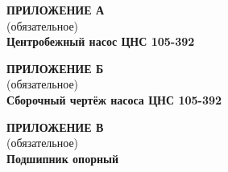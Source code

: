 
\newpage
{}
{}
\begin{center}
{\normalsize\bfseries ПРИЛОЖЕНИЕ А}\\
(обязательное)\\[\baselineskip]
{\normalsize\bfseries Центробежный насос ЦНС 105-392}
\end{center}

\newpage
{}
{}
\begin{center}
{\normalsize\bfseries ПРИЛОЖЕНИЕ Б}\\
(обязательное)\\[\baselineskip]
{\normalsize\bfseries Сборочный чертёж насоса ЦНС 105-392}
\end{center}

\newpage
{}
{}
\begin{center}
{\normalsize\bfseries ПРИЛОЖЕНИЕ В}\\
(обязательное)\\[\baselineskip]
{\normalsize\bfseries Подшипник опорный}
\end{center}
